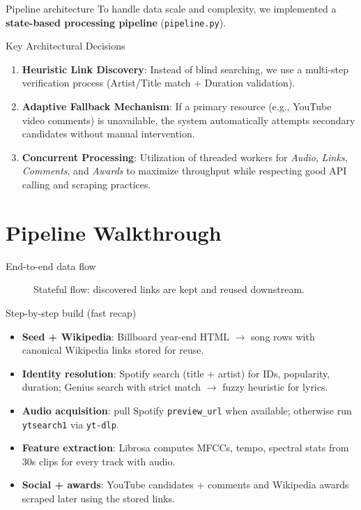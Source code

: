\documentclass{beamer}
\begin{document}
\begin{frame}{Pipeline architecture}
    To handle data scale and complexity, we implemented a \textbf{state-based processing pipeline} (\texttt{pipeline.py}).
    
    \begin{block}{Key Architectural Decisions}
        \begin{enumerate}
            \item \textbf{Heuristic Link Discovery}: 
            Instead of blind searching, we use a multi-step verification process (Artist/Title match + Duration validation).
            
            \item \textbf{Adaptive Fallback Mechanism}:
            If a primary resource (e.g., YouTube video comments) is unavailable, the system automatically attempts secondary candidates without manual intervention.
            
            \item \textbf{Concurrent Processing}:
            Utilization of threaded workers for \textit{Audio}, \textit{Links}, \textit{Comments}, and \textit{Awards} to maximize throughput while respecting good API calling and scraping  practices.
        \end{enumerate}
    \end{block}
\end{frame}

\section{Pipeline Walkthrough}
\begin{frame}{End-to-end data flow}
  \begin{figure}
    \centering
    \resizebox{\textwidth}{!}{}
    \caption{Stateful flow: discovered links are kept and reused downstream.}
  \end{figure}
\end{frame}


\begin{frame}{Step-by-step build (fast recap)}
    \begin{itemize}
        \item \textbf{Seed + Wikipedia}: Billboard year-end HTML $\rightarrow$ song rows with canonical Wikipedia links stored for reuse.
        \item \textbf{Identity resolution}: Spotify search (title + artist) for IDs, popularity, duration; Genius search with strict match $\rightarrow$ fuzzy heuristic for lyrics.
        \item \textbf{Audio acquisition}: pull Spotify \texttt{preview\_url} when available; otherwise run \texttt{ytsearch1} via \texttt{yt-dlp}.
        \item \textbf{Feature extraction}: Librosa computes MFCCs, tempo, spectral stats from 30s clips for every track with audio.
        \item \textbf{Social + awards}: YouTube candidates + comments and Wikipedia awards scraped later using the stored links.
    \end{itemize}
\end{frame}
\end{document}
